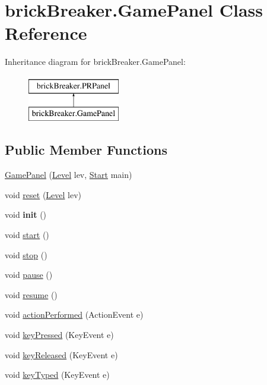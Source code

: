 \hypertarget{classbrick_breaker_1_1_game_panel}{
\section{brickBreaker.GamePanel Class Reference}
\label{classbrick_breaker_1_1_game_panel}
}
Inheritance diagram for brickBreaker.GamePanel:\begin{figure}[H]
\begin{center}
\leavevmode
\includegraphics[height=2cm]{classbrick_breaker_1_1_game_panel}
\end{center}
\end{figure}
\subsection*{Public Member Functions}
\begin{DoxyCompactItemize}
\item 
\hyperlink{classbrick_breaker_1_1_game_panel_a9babd944824d2c3462b8dbdc099d65b4}{GamePanel} (\hyperlink{classbrick_breaker_1_1_level}{Level} lev, \hyperlink{classbrick_breaker_1_1_start}{Start} main)
\item 
void \hyperlink{classbrick_breaker_1_1_game_panel_a55dcdeddbe45e2a0d1b4e3ac792aefc4}{reset} (\hyperlink{classbrick_breaker_1_1_level}{Level} lev)
\item 
\hypertarget{classbrick_breaker_1_1_game_panel_a65a1fcc7b053868c7ee654c10036c4a0}{
void {\bfseries init} ()}
\label{classbrick_breaker_1_1_game_panel_a65a1fcc7b053868c7ee654c10036c4a0}

\item 
void \hyperlink{classbrick_breaker_1_1_game_panel_ac06637c2b612d44711aebefde82249bc}{start} ()
\item 
void \hyperlink{classbrick_breaker_1_1_game_panel_adda952b668cd479832134a4c0ddfbc41}{stop} ()
\item 
void \hyperlink{classbrick_breaker_1_1_game_panel_a74382da15296d8ed9be081e4e6af72cc}{pause} ()
\item 
void \hyperlink{classbrick_breaker_1_1_game_panel_af987d9ffe6d1d68941a93547bab41cfe}{resume} ()
\item 
void \hyperlink{classbrick_breaker_1_1_game_panel_a9ede756878b9f1056369baa900dcbc4f}{actionPerformed} (ActionEvent e)
\item 
void \hyperlink{classbrick_breaker_1_1_game_panel_abf3d766d8fff87e69bfaf8ff59c438f3}{keyPressed} (KeyEvent e)
\item 
void \hyperlink{classbrick_breaker_1_1_game_panel_a8c41cc926e88dc8d1a1c241e6b9ef12e}{keyReleased} (KeyEvent e)
\item 
void \hyperlink{classbrick_breaker_1_1_game_panel_a23a455353c5904274a39f0f224cb0005}{keyTyped} (KeyEvent e)
\end{DoxyCompactItemize}
